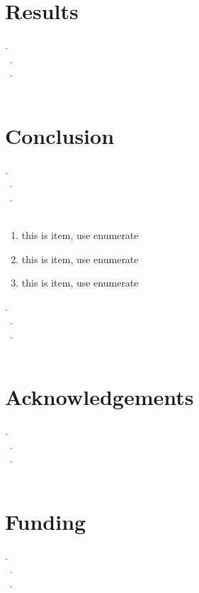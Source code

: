 \documentclass{bioinfo}
\begin{document}
\section{Results}

.\\\
.\\\
.\\\


\section{Conclusion}
.\\\
.\\\
.\\\

\begin{enumerate}
\item this is item, use enumerate
\item this is item, use enumerate
\item this is item, use enumerate
\end{enumerate}
.\\\
.\\\
.\\\


\section*{Acknowledgements}
.\\\
.\\\
.\\\

\section*{Funding}

.\\\
.\\\
.\\\
\vspace*{-12pt}

%
%
%
%
%
%
%
%
%
\end{document}
